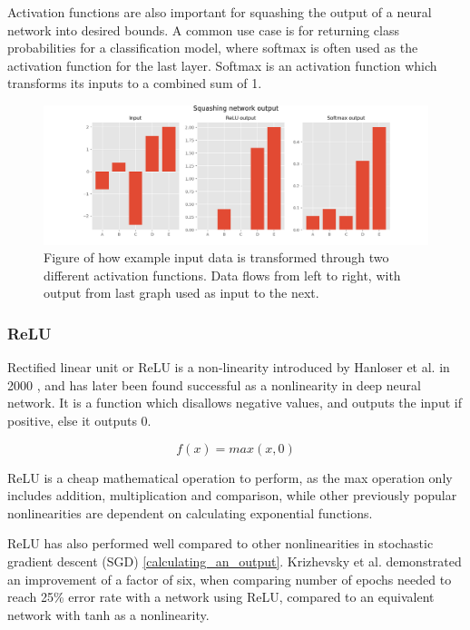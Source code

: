 Activation functions are also important for squashing the output of a neural network into desired bounds. A common use case is for returning class probabilities for a classification model, where softmax is often used as the activation function for the last layer. Softmax is an activation function which transforms its inputs to a combined sum of 1.\cite{sharma_understanding_2018}

\begin{figure}[H]
  \centering
    \includegraphics[width=\textwidth]{Assets/Chapter2_Theory/squashin_output_data_using_activation_functions.png}
    \caption{Figure of how example input data is transformed through two different activation functions. Data flows from left to right, with output from last graph used as input to the next.}
\end{figure}




\subsubsection{ReLU}

Rectified linear unit or ReLU is a non-linearity introduced by Hanloser et al. in 2000 \cite{smith_scientist_1997}, and has later been found successful as a nonlinearity in deep neural network. It is a function which disallows negative values, and outputs the input if positive, else it outputs 0.

\begin{equation}
    f(x) = max(x, 0)
\end{equation}

ReLU is a cheap mathematical operation to perform, as the max operation only includes addition, multiplication and comparison, while other previously popular nonlinearities are dependent on calculating exponential functions. 

ReLU has also performed well compared to other nonlinearities in stochastic gradient descent (SGD) \ref{calculating_an_output}. Krizhevsky et al. demonstrated an improvement of a factor of six, when comparing number of epochs needed to reach 25\% error rate with a network using ReLU, compared to an equivalent network with tanh as a nonlinearity. \cite{krizhevsky_imagenet_2012}

